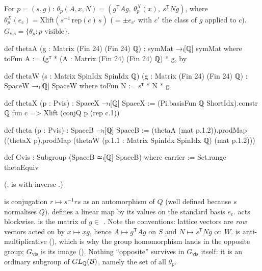 \begin{definition}\label{ch21:def:Gvis}
For $p=(s,g)$: $\theta_p(A,x,N)=(g^{\mathsf T}Ag,\ \theta^X_p(x),\ s^{\mathsf T}Ng)$, where
$\theta^X_p(e_c)=\mathrm{Xlift}(s^{-1}\,\mathrm{rep}(c)\,s)$ ($=\pm e_{c'}$ with $c'$ the class of
$g$ applied to $c$).  $G_{\mathrm{vis}}=\{\theta_p:p\text{ visible}\}$.
\end{definition}
\begin{leancode}
def thetaA (g : Matrix (Fin 24) (Fin 24) ℚ) : symMat →ₗ[ℚ] symMat where
  toFun A := ⟨gᵀ * (A : Matrix (Fin 24) (Fin 24) ℚ) * g, by
\end{leancode}
\begin{leancode}
def thetaW (s : Matrix SpinIdx SpinIdx ℚ) (g : Matrix (Fin 24) (Fin 24) ℚ) :
    SpaceW →ₗ[ℚ] SpaceW where
  toFun N := sᵀ * N * g
\end{leancode}
\begin{leancode}
def thetaX (p : Pvis) : SpaceX →ₗ[ℚ] SpaceX :=
  (Pi.basisFun ℚ ShortIdx).constr ℚ fun c => Xlift (conjQ p (rep c.1))
\end{leancode}
\begin{leancode}
def theta (p : Pvis) : SpaceB →ₗ[ℚ] SpaceB :=
  (thetaA (mat p.1.2)).prodMap
    ((thetaX p).prodMap (thetaW (p.1.1 : Matrix SpinIdx SpinIdx ℚ) (mat p.1.2)))
\end{leancode}
\begin{leancode}
def Gvis : Subgroup (SpaceB ≃ₗ[ℚ] SpaceB) where
  carrier := Set.range thetaEquiv
\end{leancode}
(;  is  with
inverse .)
\begin{dictionary}
 is conjugation $r\mapsto s^{-1}rs$ as an automorphism of $Q$ (well defined because $s$
normalises $Q$).   defines a linear map by its values on the standard basis
$e_c$.   acts blockwise.   is the matrix of $g\in$ .
Note the conventions: lattice vectors are \emph{row} vectors acted on by $x\mapsto xg$, hence
$A\mapsto g^{\mathsf T}Ag$ on $S$ and $N\mapsto s^{\mathsf T}Ng$ on $W$.   is
anti-multiplicative (), which
is why the group homomorphism  lands in the opposite group; $G_{\mathrm{vis}}$ is its
image ().  Nothing ``opposite'' survives in $G_{\mathrm{vis}}$ itself: it
is an ordinary subgroup of $GL_{\mathbb{Q}}(\mathcal{B})$, namely the set of all $\theta_p$.
\end{dictionary}

